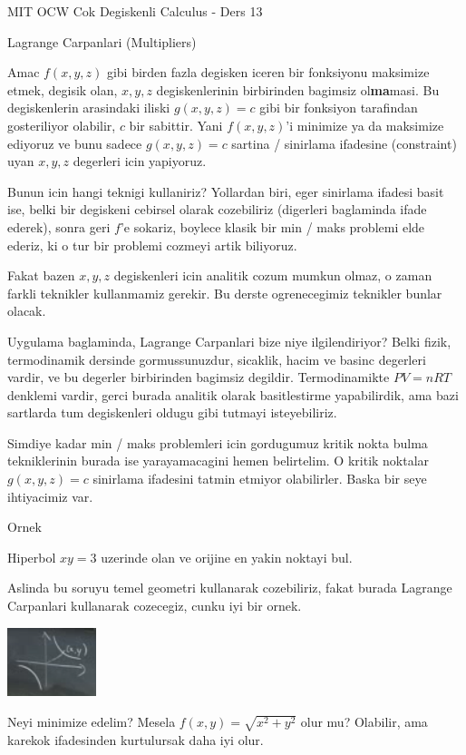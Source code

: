 \documentclass[12pt,fleqn]{article}
\begin{document}
MIT OCW Cok Degiskenli Calculus - Ders 13

Lagrange Carpanlari (Multipliers)

Amac $f(x,y,z)$ gibi birden fazla degisken iceren bir fonksiyonu maksimize
etmek, degisik olan, $x,y,z$ degiskenlerinin birbirinden bagimsiz
ol\textbf{ma}masi. Bu degiskenlerin arasindaki iliski $g(x,y,z)=c$ gibi bir
fonksiyon tarafindan gosteriliyor olabilir, $c$ bir sabittir. Yani
$f(x,y,z)$'i minimize ya da maksimize ediyoruz ve bunu sadece $g(x,y,z)=c$
sartina / sinirlama ifadesine (constraint) uyan $x,y,z$ degerleri icin yapiyoruz.

Bunun icin hangi teknigi kullaniriz? Yollardan biri, eger sinirlama ifadesi
basit ise, belki bir degiskeni cebirsel olarak cozebiliriz (digerleri
baglaminda ifade ederek), sonra geri $f$'e sokariz, boylece klasik bir min
/ maks problemi elde ederiz, ki o tur bir problemi cozmeyi artik biliyoruz.

Fakat bazen $x,y,z$ degiskenleri icin analitik cozum mumkun olmaz, o zaman
farkli teknikler kullanmamiz gerekir. Bu derste ogrenecegimiz teknikler
bunlar olacak. 

Uygulama baglaminda, Lagrange Carpanlari bize niye ilgilendiriyor? Belki
fizik, termodinamik dersinde gormussunuzdur, sicaklik, hacim ve basinc
degerleri vardir, ve bu degerler birbirinden bagimsiz
degildir. Termodinamikte $PV=nRT$ denklemi vardir, gerci burada analitik
olarak basitlestirme yapabilirdik, ama bazi sartlarda tum degiskenleri
oldugu gibi tutmayi isteyebiliriz. 

Simdiye kadar min / maks problemleri icin gordugumuz kritik nokta bulma
tekniklerinin burada ise yarayamacagini hemen belirtelim. O kritik noktalar
$g(x,y,z)=c$ sinirlama ifadesini tatmin etmiyor olabilirler. Baska bir seye
ihtiyacimiz var. 

Ornek

Hiperbol $xy =3$ uzerinde olan ve orijine en yakin noktayi bul. 

Aslinda bu soruyu temel geometri kullanarak cozebiliriz, fakat burada
Lagrange Carpanlari kullanarak cozecegiz, cunku iyi bir ornek. 

\includegraphics[height=2cm]{13_1.png}

Neyi minimize edelim? Mesela $f(x,y) = \sqrt{x^2 + y^2}$ olur mu? Olabilir,
ama karekok ifadesinden kurtulursak daha iyi olur. 
\end{document}

